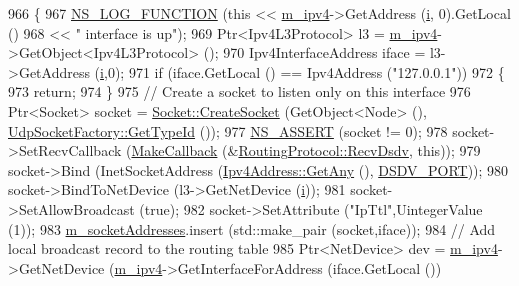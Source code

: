 \begin{DoxyCode}
966 \{
967   \hyperlink{log-macros-disabled_8h_a90b90d5bad1f39cb1b64923ea94c0761}{NS\_LOG\_FUNCTION} (\textcolor{keyword}{this} << \hyperlink{classns3_1_1dsdv_1_1RoutingProtocol_a955477c7f38e64762a264c24e3762af6}{m\_ipv4}->GetAddress (\hyperlink{bernuolliDistribution_8m_a6f6ccfcf58b31cb6412107d9d5281426}{i}, 0).GetLocal ()
968                         << \textcolor{stringliteral}{" interface is up"});
969   Ptr<Ipv4L3Protocol> l3 = \hyperlink{classns3_1_1dsdv_1_1RoutingProtocol_a955477c7f38e64762a264c24e3762af6}{m\_ipv4}->GetObject<Ipv4L3Protocol> ();
970   Ipv4InterfaceAddress iface = l3->GetAddress (\hyperlink{bernuolliDistribution_8m_a6f6ccfcf58b31cb6412107d9d5281426}{i},0);
971   \textcolor{keywordflow}{if} (iface.GetLocal () == Ipv4Address (\textcolor{stringliteral}{"127.0.0.1"}))
972     \{
973       \textcolor{keywordflow}{return};
974     \}
975   \textcolor{comment}{// Create a socket to listen only on this interface}
976   Ptr<Socket> socket = \hyperlink{classns3_1_1Socket_ad448a62bb50ad3dbac59c879a885a8d2}{Socket::CreateSocket} (GetObject<Node> (),
      \hyperlink{classns3_1_1UdpSocketFactory_ad5b47e944de8861e3dc2b6de1ccbdf5b}{UdpSocketFactory::GetTypeId} ());
977   \hyperlink{assert_8h_a6dccdb0de9b252f60088ce281c49d052}{NS\_ASSERT} (socket != 0);
978   socket->SetRecvCallback (\hyperlink{group__makecallbackmemptr_ga9376283685aa99d204048d6a4b7610a4}{MakeCallback} (&\hyperlink{classns3_1_1dsdv_1_1RoutingProtocol_ad27475d64bfd478b57d73f3cc08d4c99}{RoutingProtocol::RecvDsdv},\textcolor{keyword}{
      this}));
979   socket->Bind (InetSocketAddress (\hyperlink{classns3_1_1Ipv4Address_a7a39b330c8e701183a411d5779fca1a4}{Ipv4Address::GetAny} (), 
      \hyperlink{classns3_1_1dsdv_1_1RoutingProtocol_a14b063286a3c34efb9537f6456af3271}{DSDV\_PORT}));
980   socket->BindToNetDevice (l3->GetNetDevice (\hyperlink{bernuolliDistribution_8m_a6f6ccfcf58b31cb6412107d9d5281426}{i}));
981   socket->SetAllowBroadcast (\textcolor{keyword}{true});
982   socket->SetAttribute (\textcolor{stringliteral}{"IpTtl"},UintegerValue (1));
983   \hyperlink{classns3_1_1dsdv_1_1RoutingProtocol_a9f3be507604655079b145f063cf036fd}{m\_socketAddresses}.insert (std::make\_pair (socket,iface));
984   \textcolor{comment}{// Add local broadcast record to the routing table}
985   Ptr<NetDevice> dev = \hyperlink{classns3_1_1dsdv_1_1RoutingProtocol_a955477c7f38e64762a264c24e3762af6}{m\_ipv4}->GetNetDevice (\hyperlink{classns3_1_1dsdv_1_1RoutingProtocol_a955477c7f38e64762a264c24e3762af6}{m\_ipv4}->GetInterfaceForAddress (iface.GetLocal ())

\end{DoxyCode}
